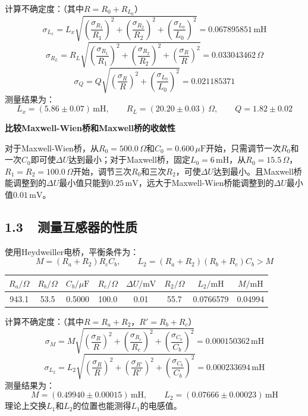\documentclass[a4paper,fontset=windows]{ctexart}
\begin{document}
    计算不确定度：（其中$R = R_0 + R_{L_0}$）
    \[
    \sigma_{L_x} = L_x\sqrt{\left(\frac{\sigma_{R_1}}{R_1}\right)^2 + \left(\frac{\sigma_{R_2}}{R_2}\right)^2 + \left(\frac{\sigma_{L_0}}{L_0}\right)^2} = 0.067895851\,\mathrm{mH}
    \]
    \[
    \sigma_{R_L} = R_L\sqrt{\left(\frac{\sigma_{R_1}}{R_1}\right)^2 + \left(\frac{\sigma_{R_2}}{R_2}\right)^2 + \left(\frac{\sigma_{R}}{R}\right)^2} = 0.033043462\,\Omega
    \]
    \[
    \sigma_{Q} = Q\sqrt{\left(\frac{\sigma_{R}}{R}\right)^2 + \left(\frac{\sigma_{L_0}}{L_0}\right)^2} = 0.021185371
    \]
    测量结果为：
    \[
    L_x = (5.86\pm0.07)\,\mathrm{mH},\qquad
    R_L = (20.20\pm0.03)\,\Omega,\qquad
    Q = 1.82\pm0.02
    \]

    \textbf{比较Maxwell-Wien桥和Maxwell桥的收敛性}

    对于Maxwell-Wien桥，从$R_0 = 500.0\,\Omega$和$C_0 = 0.600\,\mu\mathrm{F}$开始，只需调节一次$R_0$和一次$C_0$即可使$\Delta U$达到最小；对于Maxwell桥，固定$L_0 = 6\,\mathrm{mH}$，从$R_0 = 15.5\,\Omega$，$R_1 = R_2 = 100.0\,\Omega$开始，调节三次$R_0$和三次$R_2$，可使$\Delta U$达到最小。且Maxwell桥能调整到的$\Delta U$最小值只能到$0.25\,\mathrm{mV}$，远大于Maxwell-Wien桥能调整到的$\Delta U$最小值$0.01\,\mathrm{mV}$。

    \subsection*{1.3\ \ 测量互感器的性质}

    使用Heydweiller电桥，平衡条件为：
    \[
    M = (R_a + R_2)R_cC_b,\qquad L_2 = (R_a+R_2)(R_b+R_c)C_b > M
    \]

    \begin{center}
    \begin{tabular}{|c|c|c|c|c|c|c|c|}
        \hline
        $R_a/\Omega$ & $R_b/\Omega$ & $C_b/\mu\mathrm{F}$ & $R_c/\Omega$ & $\Delta U/\mathrm{mV}$ & $R_2/\Omega$ & $L_2/\mathrm{mH}$ & $M/\mathrm{mH}$ \\
        \hline
        943.1 & 53.5 & 0.5000 & 100.0 & 0.01 & 55.7 & 0.0766579 & 0.04994 \\
        \hline
    \end{tabular}
    \end{center}


    计算不确定度：（其中$R = R_a+R_2$，$R' = R_b+R_c$）
    \[
    \sigma_{M} = M\sqrt{\left(\frac{\sigma_{R}}{R}\right)^2 + \left(\frac{\sigma_{R_c}}{R_c}\right)^2 + \left(\frac{\sigma_{C_b}}{C_b}\right)^2} = 0.000150362\,\mathrm{mH}
    \]
    \[
    \sigma_{L_2} = L_2\sqrt{\left(\frac{\sigma_{R}}{R}\right)^2 + \left(\frac{\sigma_{R'}}{R'}\right)^2 + \left(\frac{\sigma_{C_b}}{C_b}\right)^2} = 0.000233694\,\mathrm{mH}
    \]
    测量结果为：
    \[
    M = (0.49940\pm0.00015)\,\mathrm{mH},\qquad
    L_2 = (0.07666\pm0.00023)\,\mathrm{mH}
    \]
    理论上交换$L_1$和$L_2$的位置也能测得$L_1$的电感值。
\end{document}
